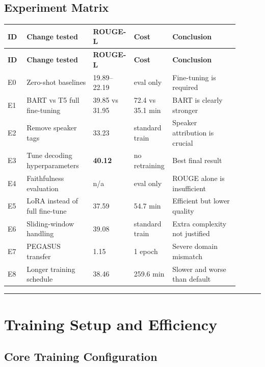 \documentclass[11pt,a4paper]{article}
\newcommand{\sectionrule}{\vspace{6pt}\hrule\vspace{10pt}}
\begin{document}
\subsection{Experiment Matrix}

\begin{center}
\small
\begin{longtable}{p{0.08\linewidth}p{0.29\linewidth}p{0.12\linewidth}p{0.13\linewidth}p{0.28\linewidth}}
\toprule
\textbf{ID} & \textbf{Change tested} & \textbf{ROUGE-L} & \textbf{Cost} & \textbf{Conclusion} \\
\midrule
\endfirsthead
\toprule
\textbf{ID} & \textbf{Change tested} & \textbf{ROUGE-L} & \textbf{Cost} & \textbf{Conclusion} \\
\midrule
\endhead
E0 & Zero-shot baselines & 19.89--22.19 & eval only & Fine-tuning is required \\
E1 & BART vs T5 full fine-tuning & 39.85 vs 31.95 & 72.4 vs 35.1 min & BART is clearly stronger \\
E2 & Remove speaker tags & 33.23 & standard train & Speaker attribution is crucial \\
E3 & Tune decoding hyperparameters & \textbf{40.12} & no retraining & Best final result \\
E4 & Faithfulness evaluation & n/a & eval only & ROUGE alone is insufficient \\
E5 & LoRA instead of full fine-tune & 37.59 & 54.7 min & Efficient but lower quality \\
E6 & Sliding-window handling & 39.08 & standard train & Extra complexity not justified \\
E7 & PEGASUS transfer & 1.15 & 1 epoch & Severe domain mismatch \\
E8 & Longer training schedule & 38.46 & 259.6 min & Slower and worse than default \\
\bottomrule
\end{longtable}
\end{center}

\sectionrule

\section{Training Setup and Efficiency}

\subsection{Core Training Configuration}
\end{document}
